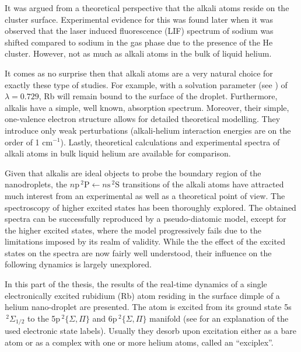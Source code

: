 		It was argued from a theoretical perspective\citep{Dalfovo1994} that the alkali atoms reside on the cluster surface. Experimental evidence for this was found\citep{Stienkemeier1995-1,Stienkemeier1995-2,Ancilotto1995-1} later when it was observed that the laser induced fluorescence (LIF) spectrum of sodium was shifted compared to sodium in the gas phase due to the presence of the He cluster. However, not as much as alkali atoms in the bulk of liquid helium.
	
		It comes as no surprise then that alkali atoms are a very natural choice for exactly these type of studies.  For example, with a solvation parameter (see ) of $\lambda=0.729$\citep{Anc95}, Rb will remain bound to the surface of the droplet. Furthermore, alkalis have a simple, well known, absorption spectrum. Moreover, their simple, one-valence electron structure allows for detailed theoretical modelling. They introduce only weak perturbations (alkali-helium interaction energies are on the order of 1 cm$^{-1}$\citep{Pat91}). Lastly, theoretical calculations\citep{Ancilotto1995-2,Kanorsky1994} and experimental spectra\citep{Tabbert1995,Takahashi1993,Beijersbergen1993} of alkali atoms in bulk liquid helium are available for comparison.
	
		Given that alkalis are ideal objects to probe the boundary region of the nanodroplets, the $n\mathrm{p}\,^2\mathrm{P}\!\longleftarrow\!n\mathrm{s}\,^2\mathrm{S}$ transitions of the alkali atoms have attracted much interest from an experimental as well as a theoretical point of view. The spectroscopy of higher excited states has been thoroughly explored\citep{Log11b,Log11a,Lackner2012,Lackner2013,The11,Fec12,Pif10,Lac11,Theisen2011,Lac13}. The obtained spectra can be successfully reproduced by a pseudo-diatomic model, except for the higher excited states, where the model progressively fails due to the limitations imposed by its realm of validity\citep{Sti96,Bunermann2007}. While the the effect of the excited states on the spectra are now fairly well understood, their influence on the following dynamics is largely unexplored.
	
		In this part of the thesis, the results of the real-time dynamics of a single electronically excited rubidium (Rb) atom residing in the surface dimple of a helium nano-droplet are presented. The atom is excited from its ground state 5s$\,^2\Sigma_{1/2}$ to the 5p$\,^2\{\Sigma,\Pi\}$ and 6p$\,^2\{\Sigma,\Pi\}$ manifold (see  for an explanation of the used electronic state labels). Usually they desorb upon excitation either as a bare atom or as a complex with one or more helium atoms, called an ``exciplex''.	
	
